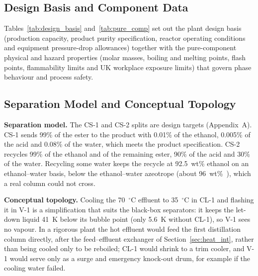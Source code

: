 \documentclass[10pt,a4paper]{article}
\begin{document}
\subsection{Design Basis and Component Data}

Tables~\ref{tab:design_basis} and~\ref{tab:pure_comp} set out the plant design basis (production capacity, product purity specification, reactor operating conditions and equipment pressure-drop allowances) together with the pure-component physical and hazard properties (molar masses, boiling and melting points, flash points, flammability limits and UK workplace exposure limits) that govern phase behaviour and process safety.

\subsection{Separation Model and Conceptual Topology}

\textbf{Separation model.} The CS-1 and CS-2 splits are design targets (Appendix~A). CS-1 sends 99\% of the ester to the product with 0.01\% of the ethanol, 0.005\% of the acid and 0.08\% of the water, which meets the product specification. CS-2 recycles 99\% of the ethanol and of the remaining ester, 90\% of the acid and 30\% of the water. Recycling some water keeps the recycle at 92.5~wt\% ethanol on an ethanol--water basis, below the ethanol--water azeotrope (about 96~wt\%~\cite{ref7}), which a real column could not cross.

\textbf{Conceptual topology.} Cooling the 70~$^\circ$C effluent to 35~$^\circ$C in CL-1 and flashing it in V-1 is a simplification that suits the black-box separators: it keeps the let-down liquid 41~K below its bubble point (only 5.6~K without CL-1), so V-1 sees no vapour. In a rigorous plant the hot effluent would feed the first distillation column directly, after the feed--effluent exchanger of Section~\ref{sec:heat_int}, rather than being cooled only to be reboiled; CL-1 would shrink to a trim cooler, and V-1 would serve only as a surge and emergency knock-out drum, for example if the cooling water failed.
\end{document}

